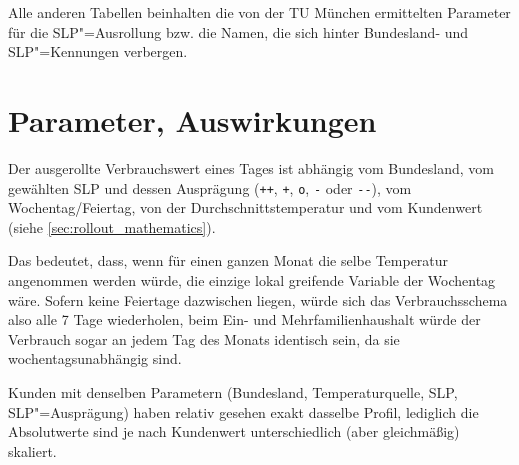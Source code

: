 Alle anderen Tabellen beinhalten die von der TU München ermittelten Parameter für die SLP"=Ausrollung bzw. die Namen, die sich hinter Bundesland- und SLP"=Kennungen verbergen.

\section{Parameter, Auswirkungen}

Der ausgerollte Verbrauchswert eines Tages ist abhängig vom Bundesland, vom gewählten SLP und dessen Ausprägung (\verb|++|, \verb|+|, \verb|o|, \verb|-| oder \verb|--|), vom Wochentag/Feiertag, von der Durchschnittstemperatur und vom Kundenwert (siehe \vref{sec:rollout_mathematics}).

Das bedeutet, dass, wenn für einen ganzen Monat die selbe Temperatur angenommen werden würde, die einzige lokal greifende Variable der Wochentag wäre. Sofern keine Feiertage dazwischen liegen, würde sich das Verbrauchsschema also alle 7 Tage wiederholen, beim Ein- und Mehrfamilienhaushalt würde der Verbrauch sogar an jedem Tag des Monats identisch sein, da sie wochentagsunabhängig sind.

Kunden mit denselben Parametern (Bundesland, Temperaturquelle, SLP, SLP"=Ausprägung) haben relativ gesehen exakt dasselbe Profil, lediglich die Absolutwerte sind je nach Kundenwert unterschiedlich (aber gleichmäßig) skaliert.

